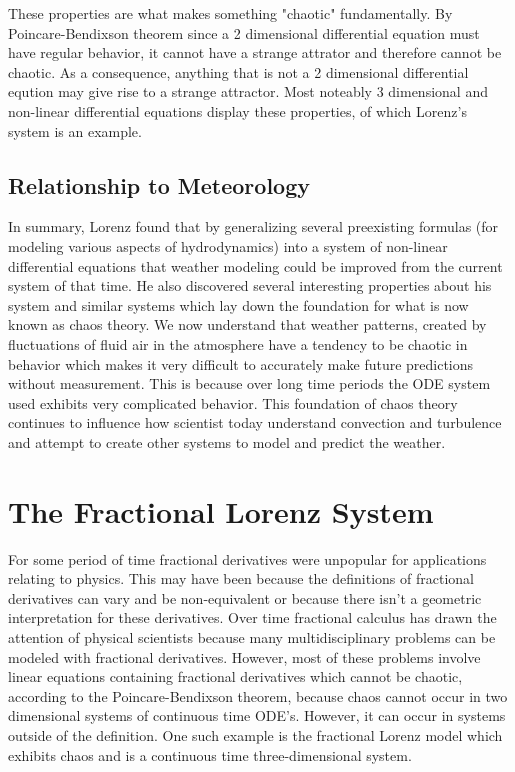 \documentclass[letterpaper,titlepage,10pt]{article}
\begin{document}
{These properties are what makes something "chaotic" fundamentally. By Poincare-Bendixson theorem \cite{j} since a 2 dimensional differential equation must have regular behavior, it cannot have a strange attrator and therefore cannot be chaotic. As a consequence, anything that is not a 2 dimensional differential eqution may give rise to a strange attractor. Most noteably 3 dimensional and non-linear differential equations display these properties, of which Lorenz's system is an example.
}

\subsection{Relationship to Meteorology}
In summary, Lorenz found that by generalizing several preexisting formulas (for modeling various aspects of hydrodynamics) into a system of non-linear differential equations that weather modeling could be improved from the current system of that time. He also discovered several interesting properties about his system and similar systems which lay down the foundation for what is now known as chaos theory. We now understand that weather patterns, created by fluctuations of fluid air in the atmosphere have a tendency to be chaotic in behavior which makes it very difficult to accurately make future predictions without measurement. This is because over long time periods the ODE system used exhibits very complicated behavior. This foundation of chaos theory continues to influence how scientist today understand convection and turbulence and attempt to create other systems to model and predict the weather. 

\section{The Fractional Lorenz System}
For some period of time fractional derivatives were unpopular for applications relating to physics. This  may have been because the definitions of fractional derivatives can vary and be non-equivalent or because there isn't a geometric interpretation for these derivatives. Over time  fractional calculus has drawn the attention of physical scientists because many multidisciplinary problems can be modeled with fractional derivatives.  However, most of these problems involve linear equations containing fractional derivatives which cannot be chaotic, according to the Poincare-Bendixson theorem\cite{a}, because chaos cannot occur in two dimensional systems of continuous time ODE's. However, it can occur in systems outside of the definition. One such example is the fractional Lorenz model which exhibits chaos and is a continuous time three-dimensional system.
\end{document}
